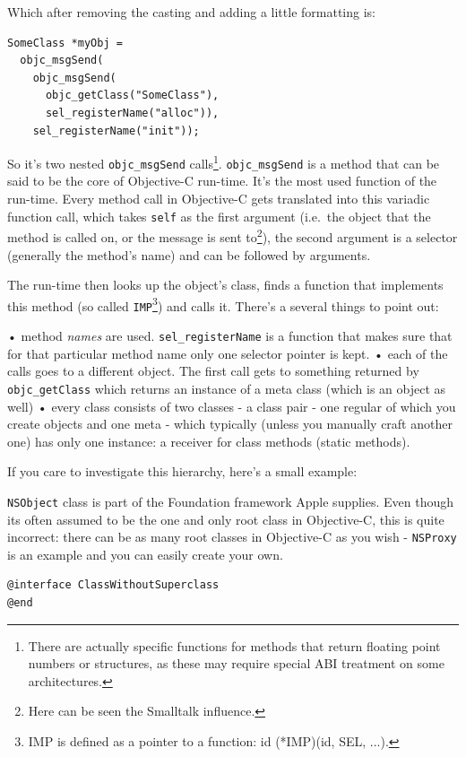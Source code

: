 \documentclass[a4paper, 11pt, fleqn]{book}
\begin{document}
Which after removing the casting and adding a little formatting is:

\begin{verbatim}SomeClass *myObj = 
  objc_msgSend(
    objc_msgSend(
      objc_getClass("SomeClass"),  
      sel_registerName("alloc")), 
    sel_registerName("init"));
\end{verbatim}

So it's two nested \verb=objc_msgSend= calls\footnote{There are actually specific functions for methods that return floating point numbers or structures, as these may require special ABI treatment on some architectures.}. \verb=objc_msgSend= is a method that can be said to be the core of Objective-C run-time. It's the most used function of the run-time. Every method call in Objective-C gets translated into this variadic function call, which takes \verb=self= as the first argument (i.e.\ the object that the method is called on, or the message is sent to\footnote{Here can be seen the Smalltalk influence.}), the second argument is a selector (generally the method's name) and can be followed by arguments.

The run-time then looks up the object's class, finds a function that implements this method (so called \verb=IMP=\footnote{IMP is defined as a pointer to a function: id (*IMP)(id, SEL, ...).}) and calls it. There's a several things to point out:

• method \emph{names} are used. \verb=sel_registerName= is a function that makes sure that for that particular method name only one selector pointer is kept.
• each of the calls goes to a different object. The first call gets to something returned by \verb=objc_getClass= which returns an instance of a meta class (which is an object as well)
• every class consists of two classes - a class pair - one regular of which you create objects and one meta - which typically (unless you manually craft another one) has only one instance: a receiver for class methods (static methods).

If you care to investigate this hierarchy, here's a small example:

\verb=NSObject= class is part of the Foundation framework Apple supplies. Even though its often assumed to be the one and only root class in Objective-C, this is quite incorrect: there can be as many root classes in Objective-C as you wish - \verb=NSProxy= is an example and you can easily create your own.

\begin{verbatim}@interface ClassWithoutSuperclass
@end\end{verbatim}
\end{document}
